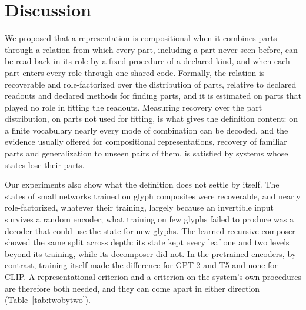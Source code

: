 \documentclass[10pt]{article}
\theoremstyle{plain}
\theoremstyle{remark}
\begin{document}
\section{Discussion}
\label{sec:discussion}

We proposed that a representation is compositional when it combines parts through a relation from which every part, including a part never seen before, can be read back in its role by a fixed procedure of a declared kind, and when each part enters every role through one shared code. Formally, the relation is recoverable and role-factorized over the distribution of parts, relative to declared readouts and declared methods for finding parts, and it is estimated on parts that played no role in fitting the readouts. Measuring recovery over the part distribution, on parts not used for fitting, is what gives the definition content: on a finite vocabulary nearly every mode of combination can be decoded, and the evidence usually offered for compositional representations, recovery of familiar parts and generalization to unseen pairs of them, is satisfied by systems whose states lose their parts.

Our experiments also show what the definition does not settle by itself. The states of small networks trained on glyph composites were recoverable, and nearly role-factorized, whatever their training, largely because an invertible input survives a random encoder; what training on few glyphs failed to produce was a decoder that could use the state for new glyphs. The learned recursive composer showed the same split across depth: its state kept every leaf one and two levels beyond its training, while its decomposer did not. In the pretrained encoders, by contrast, training itself made the difference for GPT-2 and T5 and none for CLIP. A representational criterion and a criterion on the system's own procedures are therefore both needed, and they can come apart in either direction (Table~\ref{tab:twobytwo}).
\end{document}

